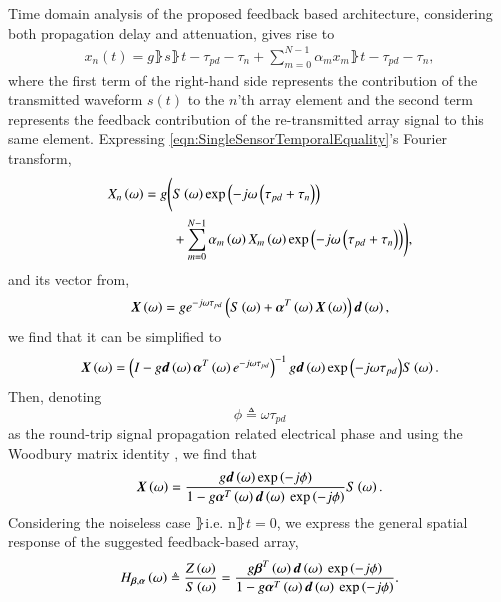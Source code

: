 Time domain analysis of the proposed feedback based architecture, considering both propagation delay and attenuation, gives rise to
\begin{equation}
    \label{eqn:SingleSensorTemporalEquality}
        \begin{split}
            x_{n}(t) = g\rBrace{s\rBrace{t-\tau_{pd}-\tau_{n}}
            +\sum_{m=0}^{N-1}{\alpha_{m}x_{m}\rBrace{t-\tau_{pd}-\tau_{n}}}},
        \end{split}
\end{equation}
where the first term of the right-hand side represents the contribution of the transmitted waveform $s(t)$ to the $n$'th array element and the second term represents the feedback contribution of the re-transmitted array signal to this same element.
Expressing \eqref{eqn:SingleSensorTemporalEquality}'s Fourier transform,
\begin{equation}
    \label{eqn_singleSensorFourier}
        \begin{split}
            \F{x}_{n}\rBrace{\omega} =
            g\Bigg( & \F{s}\rBrace{\omega}
            \exp\rBrace{-j\omega\rBrace{\tau_{pd}+\tau_{n}}}
            \\&+\sum_{m=0}^{N-1}
            {
            \alpha_{m}\rBrace{\omega}\F{x}_{m}\rBrace{\omega}
            \exp\rBrace{-j\omega\rBrace{\tau_{pd}+\tau_{n}}}
            }\Bigg),
        \end{split}
\end{equation}
and its vector from,
$$
\F{\vx}\rBrace{\omega} = ge^{-j\omega\tau_{pd}} \rBrace{\F{s}\rBrace{\omega}+\vAlphaT \F{\vx}\rBrace{\omega}}\vd,
$$
we find that it can be simplified to
$$
\F{\vx}\rBrace{\omega} =\rBrace{I-g\vd\vAlphaT{}e^{-j\omega\tau_{pd}}}^{-1}g\vd\exp{\rBrace{-j\omega\tau_{pd}}}\F{s}\rBrace{\omega}.
$$
Then, denoting
\[
\phi\triangleq\omega\tau_{pd}
\]
as the round-trip signal propagation related electrical phase and using the Woodbury matrix identity \cite{woodbury1950inverting}, we find that
$$
\F{\vx}\rBrace{\omega}
=
\frac{    
g\vd\exp{\rBrace{-j\phi}}
}{
1 - g\aTd{}\exp{\rBrace{-j\phi}}
}\F{s}\rBrace{\omega}.
$$
Considering the noiseless case $\rBrace{\text{i.e. n}\rBrace{t}=0}$,
we express the general spatial response of the suggested feedback-based array, 
\begin{equation}
\label{eqn:GeneralFeedbackTransferFunction}
\Hba
\triangleq
\frac{\F{z}\rBrace{\omega}}{\F{s}\rBrace{\omega}} 
=
\frac{    
g\bTd{}\exp\rBrace{-j\phi}
}{
1 - g\aTd{}\exp\rBrace{-j\phi}
}.
\end{equation}
